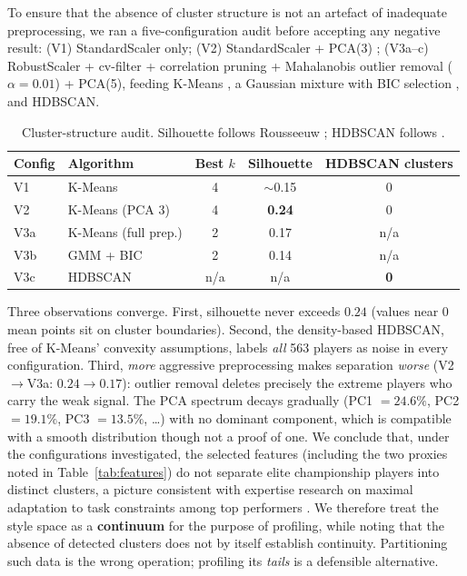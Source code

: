 \documentclass[runningheads]{llncs}
\begin{document}
To ensure that the absence of cluster structure is not an artefact of
inadequate preprocessing, we ran a five-configuration audit before
accepting any negative result: (V1) StandardScaler only; (V2)
StandardScaler + PCA(3) \cite{jolliffe2002principal}; (V3a--c)
RobustScaler + cv-filter + correlation pruning + Mahalanobis outlier
removal ($\alpha=0.01$) + PCA(5), feeding K-Means \cite{lloyd1982least},
a Gaussian mixture with BIC selection \cite{schwarz1978estimating}, and
HDBSCAN.

\begin{table}[h]
\centering\small
\caption{Cluster-structure audit. Silhouette follows
Rousseeuw \cite{rousseeuw1987silhouettes}; HDBSCAN follows
\cite{campello2013density}.}
\label{tab:audit}
\begin{tabular}{llccc}
\toprule
Config & Algorithm & Best $k$ & Silhouette & HDBSCAN clusters\\
\midrule
V1 & K-Means & 4 & $\sim$0.15 & 0\\
V2 & K-Means (PCA 3) & 4 & \textbf{0.24} & 0\\
V3a & K-Means (full prep.) & 2 & 0.17 & n/a\\
V3b & GMM + BIC & 2 & 0.14 & n/a\\
V3c & HDBSCAN & n/a & n/a & \textbf{0}\\
\bottomrule
\end{tabular}
\end{table}

Three observations converge. First, silhouette never exceeds $0.24$
(values near $0$ mean points sit on cluster boundaries). Second, the
density-based HDBSCAN, free of K-Means' convexity assumptions, labels \emph{all} 563 players as noise in every configuration. Third,
\emph{more} aggressive preprocessing makes separation \emph{worse}
(V2$\to$V3a: $0.24\to0.17$): outlier removal deletes precisely the
extreme players who carry the weak signal. The PCA spectrum decays
gradually (PC1 $=24.6\%$, PC2 $=19.1\%$, PC3 $=13.5\%$, \ldots) with no
dominant component, which is compatible with a smooth distribution
though not a proof of one. We conclude that, under the configurations
investigated, the selected features (including the two proxies noted
in Table~\ref{tab:features}) do not separate elite championship
players into distinct clusters, a picture consistent with expertise
research on maximal adaptation to task constraints among top performers
\cite{ericsson1996expert}. We therefore treat the style space as a
\textbf{continuum} for the purpose of profiling, while noting that the
absence of detected clusters does not by itself establish continuity.
Partitioning such data is the wrong operation; profiling its
\emph{tails} is a defensible alternative.
\end{document}

